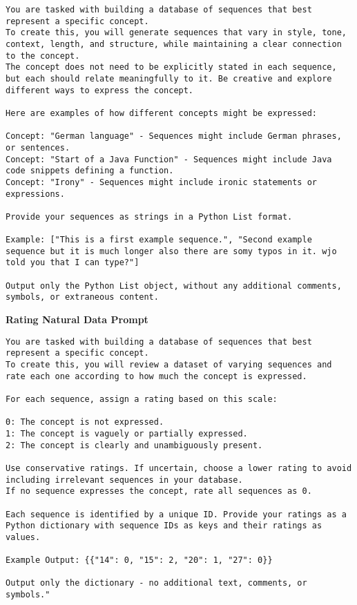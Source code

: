 \begin{lstlisting}
You are tasked with building a database of sequences that best represent a specific concept. 
To create this, you will generate sequences that vary in style, tone, context, length, and structure, while maintaining a clear connection to the concept. 
The concept does not need to be explicitly stated in each sequence, but each should relate meaningfully to it. Be creative and explore different ways to express the concept.

Here are examples of how different concepts might be expressed:

Concept: "German language" - Sequences might include German phrases, or sentences.
Concept: "Start of a Java Function" - Sequences might include Java code snippets defining a function.
Concept: "Irony" - Sequences might include ironic statements or expressions.

Provide your sequences as strings in a Python List format.

Example: ["This is a first example sequence.", "Second example sequence but it is much longer also there are somy typos in it. wjo told you that I can type?"]

Output only the Python List object, without any additional comments, symbols, or extraneous content.
\end{lstlisting}


\textbf{Rating Natural Data Prompt}

\begin{lstlisting}
You are tasked with building a database of sequences that best represent a specific concept. 
To create this, you will review a dataset of varying sequences and rate each one according to how much the concept is expressed.

For each sequence, assign a rating based on this scale:

0: The concept is not expressed.
1: The concept is vaguely or partially expressed.
2: The concept is clearly and unambiguously present.

Use conservative ratings. If uncertain, choose a lower rating to avoid including irrelevant sequences in your database. 
If no sequence expresses the concept, rate all sequences as 0.

Each sequence is identified by a unique ID. Provide your ratings as a Python dictionary with sequence IDs as keys and their ratings as values.

Example Output: {{"14": 0, "15": 2, "20": 1, "27": 0}}

Output only the dictionary - no additional text, comments, or symbols."    
\end{lstlisting}


